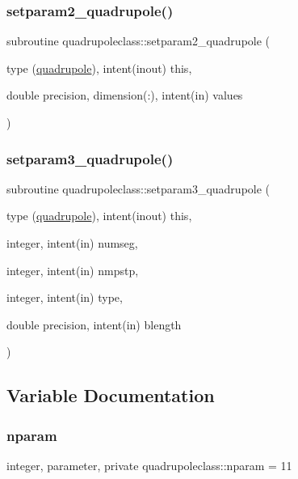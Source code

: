 \subsubsection{\texorpdfstring{setparam2\_quadrupole()}{setparam2\_quadrupole()}}
{\footnotesize\ttfamily subroutine quadrupoleclass\+::setparam2\+\_\+quadrupole (\begin{DoxyParamCaption}\item[{type (\mbox{\hyperlink{namespacequadrupoleclass_structquadrupoleclass_1_1quadrupole}{quadrupole}}), intent(inout)}]{this,  }\item[{double precision, dimension(\+:), intent(in)}]{values }\end{DoxyParamCaption})}

\mbox{\label{namespacequadrupoleclass_a6e3465265973203b8452b1b2463a2e4b}} 
\subsubsection{\texorpdfstring{setparam3\_quadrupole()}{setparam3\_quadrupole()}}
{\footnotesize\ttfamily subroutine quadrupoleclass\+::setparam3\+\_\+quadrupole (\begin{DoxyParamCaption}\item[{type (\mbox{\hyperlink{namespacequadrupoleclass_structquadrupoleclass_1_1quadrupole}{quadrupole}}), intent(inout)}]{this,  }\item[{integer, intent(in)}]{numseg,  }\item[{integer, intent(in)}]{nmpstp,  }\item[{integer, intent(in)}]{type,  }\item[{double precision, intent(in)}]{blength }\end{DoxyParamCaption})}



\subsection{Variable Documentation}
\mbox{\label{namespacequadrupoleclass_a8eba81bd9796e431c21d0f46260b0c6c}} 
\subsubsection{\texorpdfstring{nparam}{nparam}}
{\footnotesize\ttfamily integer, parameter, private quadrupoleclass\+::nparam = 11\hspace{0.3cm}{\ttfamily [private]}}


